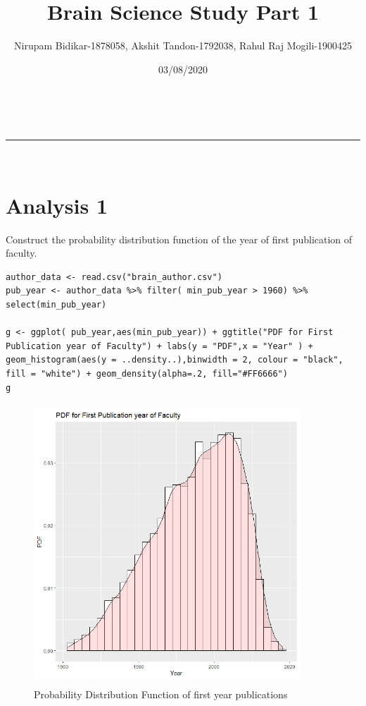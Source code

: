 \documentclass[a4paper,11pt]{article}
\makeatletter
\newcommand{\linia}{\rule{\linewidth}{0.5pt}}
\theoremstyle{mytheor}
\renewcommand{\maketitle}{
\begin{center}
\vspace{2ex}    
{\huge \textsc{\@title}}
\vspace{1ex}
\\
\linia\\
\@author \hfill \@date
\vspace{4ex}
\end{center}
}
\makeatother
\begin{document}
\title{\textbf{Brain Science Study} Part \textnumero{} 1}

\author{Nirupam Bidikar-1878058, Akshit Tandon-1792038, Rahul Raj Mogili-1900425}

\date{03/08/2020}

\maketitle

\section*{Analysis 1}

Construct the probability distribution function of the year of first publication of faculty.

\begin{lstlisting}[label={list:first},caption=Probability distribution function calculated]
author_data <- read.csv("brain_author.csv")
pub_year <- author_data %>% filter( min_pub_year > 1960) %>% select(min_pub_year)

g <- ggplot( pub_year,aes(min_pub_year)) + ggtitle("PDF for First Publication year of Faculty") + labs(y = "PDF",x = "Year" ) + geom_histogram(aes(y = ..density..),binwidth = 2, colour = "black", fill = "white") + geom_density(alpha=.2, fill="#FF6666")
g
\end{lstlisting}

\begin{figure}[htp]
    \centering
    \includegraphics[width=10cm, height=10.5cm]{PDF_firstPub.jpeg}
    \caption{Probability Distribution Function of first year publications}
    \label{fig:PDF_firstcite}
\end{figure}
\end{document}
